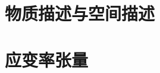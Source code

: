 \documentclass[zihao=-4,linespread=1.5,a4paper,heading=true,twoside]{ctexbook}
\theoremstyle{definition}
\theoremstyle{plain}
\begin{document}
\section{物质描述与空间描述}


\section{应变率张量}










\end{document}

